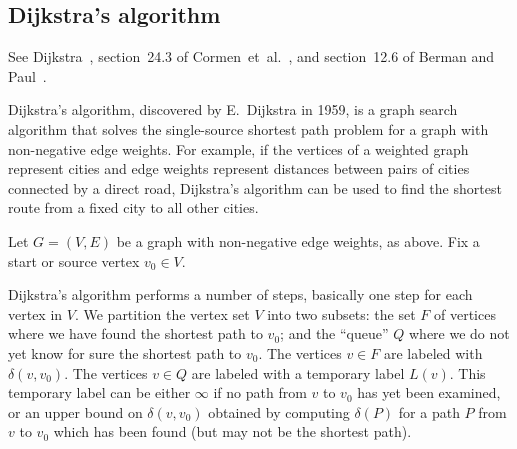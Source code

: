 \subsection{Dijkstra's algorithm}

See Dijkstra~\cite{Dijkstra1959}, section~24.3 of
Cormen~et~al.~\cite{CormenEtAl2001}, and section~12.6 of Berman and
Paul~\cite{BermanPaul1997}.

Dijkstra's algorithm, discovered by E.~Dijkstra in 1959, is a graph
search algorithm that solves the single-source shortest path problem
for a graph with non-negative edge weights. For example, if the
vertices of a weighted graph represent cities and edge weights
represent distances between pairs of cities connected by a direct
road, Dijkstra's algorithm can be used to find the shortest route from
a fixed city to all other cities.


Let $G = (V,E)$ be a graph with non-negative edge weights, as above.
Fix a start or source vertex $v_0 \in V$.

Dijkstra's algorithm performs a number of steps, basically one step
for each vertex in $V$. We partition the vertex set $V$ into two
subsets: the set $F$ of vertices where we have found the shortest path
to $v_0$; and the ``queue'' $Q$ where we do not yet know for sure the
shortest path to $v_0$. The vertices $v \in F$ are labeled with
$\delta(v, v_0)$. The vertices $v \in Q$ are labeled with a temporary
label $L(v)$. This temporary label can be either $\infty$ if no path
from $v$ to $v_0$ has yet been examined, or an upper bound on
$\delta(v, v_0)$ obtained by computing $\delta(P)$ for a path $P$ from
$v$ to $v_0$ which has been found (but may not be the shortest path).

